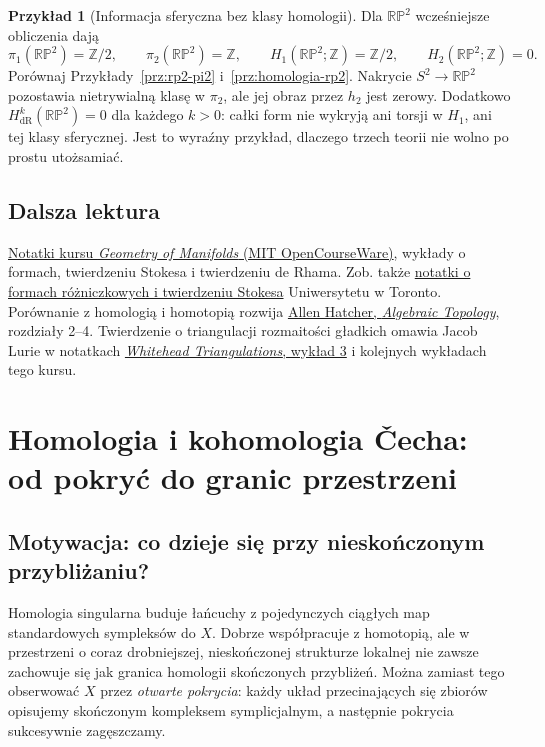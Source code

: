 \documentclass[11pt,a4paper,oneside]{report}
\newcommand{\Z}{\mathbb{Z}}
\theoremstyle{plain}
\theoremstyle{definition}
\newtheorem{przyklad}[twierdzenie]{Przykład}
\theoremstyle{remark}
\begin{document}
\begin{przyklad}[Informacja sferyczna bez klasy homologii]
Dla $\mathbb{RP}^2$ wcześniejsze obliczenia dają
\[
 \pi_1(\mathbb{RP}^2)=\Z/2,\qquad
 \pi_2(\mathbb{RP}^2)=\Z,\qquad
 H_1(\mathbb{RP}^2;\Z)=\Z/2,\qquad
 H_2(\mathbb{RP}^2;\Z)=0.
\]
Porównaj Przykłady~\ref{prz:rp2-pi2}
i~\ref{prz:homologia-rp2}. Nakrycie
$S^2\to\mathbb{RP}^2$ pozostawia nietrywialną
klasę w $\pi_2$, ale jej obraz przez $h_2$
jest zerowy. Dodatkowo
$H^k_{\mathrm{dR}}(\mathbb{RP}^2)=0$
dla każdego $k>0$: całki form nie wykryją
ani torsji w $H_1$, ani tej klasy sferycznej.
Jest to wyraźny przykład, dlaczego trzech teorii
nie wolno po prostu utożsamiać.
\end{przyklad}

\section*{Dalsza lektura}
\href{https://ocw.mit.edu/courses/18-965-geometry-of-manifolds-fall-2004/pages/lecture-notes/}
{Notatki kursu \emph{Geometry of Manifolds} (MIT OpenCourseWare)},
wykłady o formach, twierdzeniu Stokesa i twierdzeniu de Rhama.
Zob. także \href{https://www.math.toronto.edu/mgualt/courses/17-1300/docs/17-1300-notes-13.pdf}
{notatki o formach różniczkowych i twierdzeniu Stokesa}
Uniwersytetu w Toronto.
Porównanie z homologią i homotopią rozwija
\href{https://pi.math.cornell.edu/~hatcher/AT/AT.pdf}
{Allen Hatcher, \emph{Algebraic Topology}},
rozdziały 2--4. Twierdzenie o triangulacji rozmaitości
gładkich omawia Jacob Lurie w notatkach
\href{https://www.math.ias.edu/~lurie/937notes/937Lecture3.pdf}
{\emph{Whitehead Triangulations}, wykład 3} i kolejnych
wykładach tego kursu.


\chapter{Homologia i kohomologia \v{C}echa: od pokryć do granic przestrzeni}
\label{ch:cech-v4}

\section{Motywacja: co dzieje się przy nieskończonym przybliżaniu?}
Homologia singularna buduje łańcuchy z pojedynczych ciągłych map
standardowych sympleksów do $X$. Dobrze współpracuje z homotopią,
ale w przestrzeni o coraz drobniejszej, nieskończonej strukturze
lokalnej nie zawsze zachowuje się jak granica homologii
skończonych przybliżeń. Można zamiast tego obserwować $X$
przez \emph{otwarte pokrycia}: każdy układ przecinających się
zbiorów opisujemy skończonym kompleksem symplicjalnym,
a następnie pokrycia sukcesywnie zagęszczamy.
\end{document}
